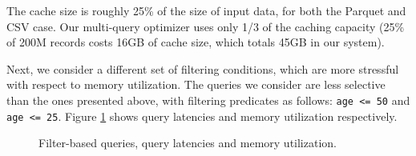 The cache size is roughly 25\% of the size of input data, for both the Parquet and CSV case. Our multi-query optimizer uses only 1/3 of the caching capacity (25\% of 200M records costs 16GB of cache size, which totals 45GB in our system).

Next, we consider a different set of filtering conditions, which are more stressful with respect to memory utilization. The queries we consider are less selective than the ones presented above, with filtering predicates as follows: \texttt{age <= 50} and \texttt{age <= 25}. Figure \ref{fig:query1_50} shows query latencies and memory utilization respectively.

\begin{figure}[!htb]
	\centering



   \caption{Filter-based queries, query latencies and memory utilization.}
   \label{fig:query1_50}
\end{figure}

